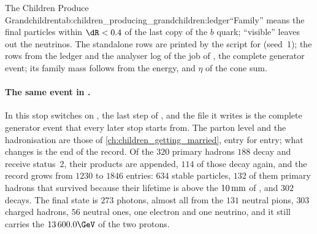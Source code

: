 \begin{ledgerboth}{The Children Produce Grandchildren}{tab:children_producing_grandchildren:ledger}{``Family''
means the final particles within $\dR<0.4$ of the last copy of the $b$
quark; ``visible'' leaves out the neutrinos. The standalone rows are
printed by the script for  (seed~1); the \CMSSW rows from
the ledger and the analyser log of the  job of
, the complete generator event; its family mass follows
from the energy, \pt and $\eta$ of the cone sum.}
\end{ledgerboth}

\paragraph{The same event in \CMSSW.} In \CMSSW this stop switches on
, the last step of \PYTHIA, and the file it
writes is the complete generator event that every later stop starts from.
The parton level and the hadronisation are those of
\cref{ch:children_getting_married}, entry for entry; what changes is the
end of the record. Of the $320$ primary hadrons $188$ decay and receive
status~2, their products are appended, $114$ of those decay again, and
the record grows from $1230$ to $1846$ entries: $634$ stable particles,
$132$ of them primary hadrons that survived because their lifetime is
above the $10\,\mathrm{mm}$ of , and $302$ decays. The
final state is $273$ photons, almost all from the $131$ neutral pions,
$303$ charged hadrons, $56$ neutral ones, one electron and one neutrino,
and it still carries the $13\,600.0\GeV$ of the two protons.

